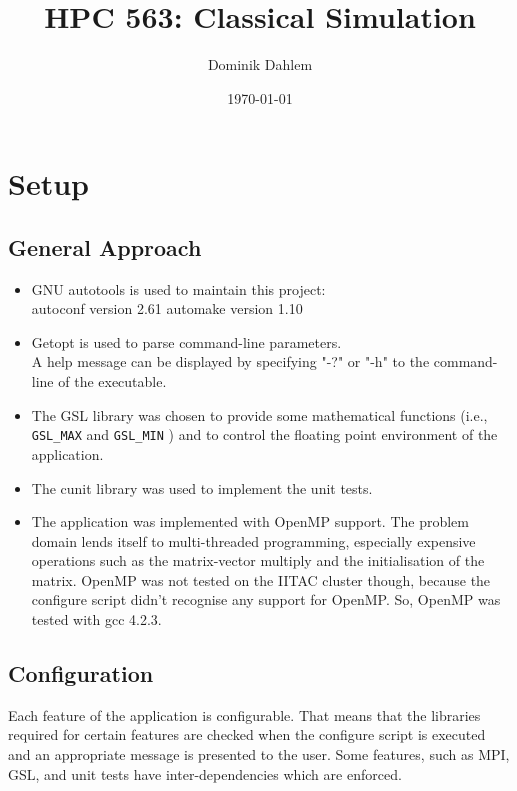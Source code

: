 \documentclass[12pt,a4paper]{report}
\author{Dominik Dahlem}
\title{HPC 563: Classical Simulation}
\date{\today}
\def\ccode#1{
  \lstinline[basicstyle=\ttfamily,language=C]{#1} }
\begin{document}
\maketitle

\chapter{Setup}
\label{cha:setup}

\section{General Approach}
\label{sec:general-approach}
\begin{itemize}
\item GNU autotools is used to maintain this project:\\
  autoconf version 2.61 automake version 1.10
\item Getopt is used to parse command-line parameters.\\
  A help message can be displayed by specifying "-?" or "-h" to the
  command-line of the executable.
\item The GSL library was chosen to provide some mathematical
  functions (i.e., \ccode{GSL_MAX} and \ccode{GSL_MIN}) and to control
  the floating point environment of the application.
\item The cunit library was used to implement the unit tests.
\item The application was implemented with OpenMP support. The problem
  domain lends itself to multi-threaded programming, especially
  expensive operations such as the matrix-vector multiply and the
  initialisation of the matrix. OpenMP was not tested on the IITAC
  cluster though, because the configure script didn't recognise any
  support for OpenMP. So, OpenMP was tested with gcc 4.2.3.
\end{itemize}

\section{Configuration}
\label{sec:configuration}
Each feature of the application is configurable. That means that the
libraries required for certain features are checked when the configure
script is executed and an appropriate message is presented to the
user. Some features, such as MPI, GSL, and unit tests have
inter-dependencies which are enforced.
\end{document}
